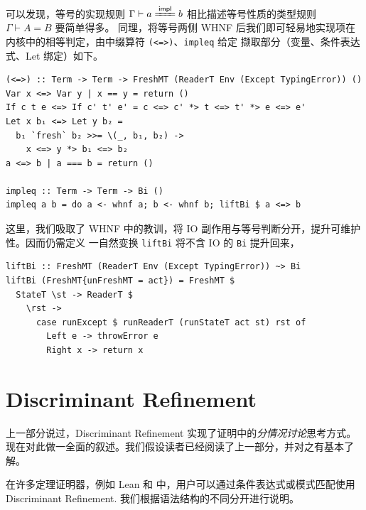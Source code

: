 可以发现，等号的实现规则 $\Gamma\vdash a \xlongequal{\mathsf{impl}} b$ 相比描述等号性质的类型规则 $\Gamma\vdash A = B$ 要简单得多。
同理，将等号两侧 WHNF 后我们即可轻易地实现项在内核中的相等判定，由中缀算符 \texttt{(<=>)}、\texttt{impleq} 给定
撷取部分（变量、条件表达式、Let 绑定）如下。
\begin{verbatim}
(<=>) :: Term -> Term -> FreshMT (ReaderT Env (Except TypingError)) ()
Var x <=> Var y | x == y = return ()
If c t e <=> If c' t' e' = c <=> c' *> t <=> t' *> e <=> e'
Let x b₁ <=> Let y b₂ =
  b₁ `fresh` b₂ >>= \(_, b₁, b₂) ->
    x <=> y *> b₁ <=> b₂
a <=> b | a === b = return ()

impleq :: Term -> Term -> Bi ()
impleq a b = do a <- whnf a; b <- whnf b; liftBi $ a <=> b
\end{verbatim}
这里，我们吸取了 WHNF 中的教训，将 IO 副作用与等号判断分开，提升可维护性。因而仍需定义
一自然变换 \texttt{liftBi} 将不含 IO 的 \texttt{Bi} 提升回来，
\begin{verbatim}
liftBi :: FreshMT (ReaderT Env (Except TypingError)) ~> Bi
liftBi (FreshMT{unFreshMT = act}) = FreshMT $
  StateT \st -> ReaderT $
    \rst ->
      case runExcept $ runReaderT (runStateT act st) rst of
        Left e -> throwError e
        Right x -> return x
\end{verbatim}

\section{Discriminant Refinement}
上一部分说过，Discriminant Refinement 实现了证明中的\emph{分情况讨论}思考方式。
现在对此做一全面的叙述。我们假设读者已经阅读了上一部分，并对之有基本了解。

在许多定理证明器，例如 Lean 和 \Tigrisd 中，用户可以通过条件表达式或模式匹配使用
Discriminant Refinement. 我们根据语法结构的不同分开进行说明。

